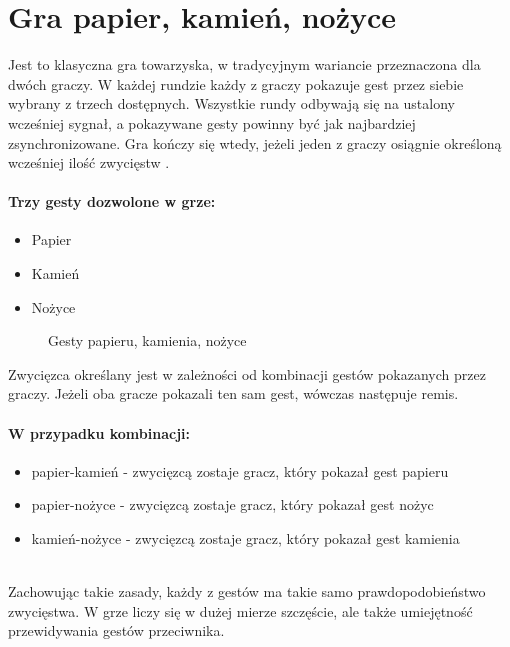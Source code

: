 \documentclass[a4paper,12pt,twoside,openany]{report}
\newcommand{\ImgPath}{.}
\begin{document}
\section{Gra papier, kamień, nożyce}
Jest to klasyczna gra towarzyska, w tradycyjnym wariancie przeznaczona dla dwóch graczy. W każdej rundzie każdy z graczy pokazuje gest przez siebie wybrany z trzech dostępnych. Wszystkie rundy odbywają się na ustalony wcześniej sygnał, a pokazywane gesty powinny być jak najbardziej zsynchronizowane. Gra kończy się wtedy, jeżeli jeden z graczy osiągnie określoną wcześniej ilość zwycięstw \cite{Fisher}.


\paragraph{Trzy gesty dozwolone w grze:}
\begin{itemize} 
	\item Papier
	\item Kamień
	\item Nożyce
\end{itemize} 

\begin{figure}[H]
	\centering
	\caption{Gesty papieru, kamienia, nożyce}
\end{figure}

Zwycięzca określany jest w zależności od kombinacji gestów pokazanych przez graczy. Jeżeli oba gracze pokazali ten sam gest, wówczas następuje remis. 

\paragraph{W przypadku kombinacji:}
\begin{itemize} 
	\item papier-kamień - zwycięzcą zostaje gracz, który pokazał gest papieru
	\item papier-nożyce - zwycięzcą zostaje gracz, który pokazał gest nożyc
	\item kamień-nożyce - zwycięzcą zostaje gracz, który pokazał gest kamienia
\end{itemize} 
\mbox{} \\	
Zachowując takie zasady, każdy z gestów ma takie samo prawdopodobieństwo zwycięstwa. W grze liczy się w dużej mierze szczęście, ale także umiejętność przewidywania gestów przeciwnika.
\end{document}
